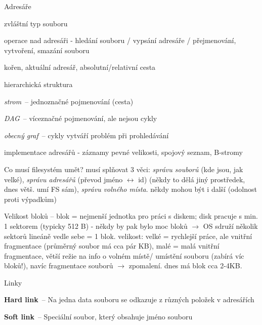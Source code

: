 \begin{obecne}{Adresáře}
  \begin{pitemize}
    \item zvláštní typ souboru
    \item operace nad adresáři - hledání souboru / vypsání adresáře /
    přejmenování, vytvoření, smazání souboru 
    \item kořen, aktuální adresář, absolutní/relativní cesta
    \item hierarchická struktura 
    \begin{pitemize}
      \item \emph{strom}~-- jednoznačné pojmenování (cesta)
      \item \emph{DAG}~-- víceznačné pojmenování, ale nejsou cykly
      \item \emph{obecný graf}~-- cykly vytváří problém při prohledávání
    \end{pitemize}
    \item implementace adresářů - záznamy pevné velikosti, spojový seznam, B-stromy 
  \end{pitemize}
\end{obecne}

\begin{obecne}{Co musí filesystém umět?}
musí splňovat 3 věci: \emph{správu souborů} (kde jsou, jak velké), \emph{správu adresářů} (převod jméno $\leftrightarrow$ id) (někdy to dělá jiný prostředek, dnes větš. umí FS sám), \emph{správu volného místa}. někdy mohou být i další (odolnost proti výpadkům) 

Velikost bloků -- blok = nejmenší jednotka pro práci s diskem; disk pracuje s min. 1 sektorem (typicky 512 B) - někdy by pak bylo moc bloků $\rightarrow$ OS sdruží několik sektorů lineáně vedle sebe = 1 blok. velikost: velké = rychlejší práce, ale vnitřní fragmentace (průměrný soubor má cca pár KB), malé = malá vnitřní fragmentace, větší režie na info o volném místě/ umístění souboru (zabírá víc bloků!), navíc fragmentace souborů $\rightarrow$ zpomalení. dnes má blok cca 2-4KB.
\end{obecne}

\begin{obecne}{Linky}
  \begin{pitemize}
    \item \textbf{Hard link}~-- Na jedna data souboru se odkazuje z různých položek v adresářích
    \item \textbf{Soft link}~-- Speciální soubor, který obsahuje jméno souboru
  \end{pitemize}
\end{obecne}

